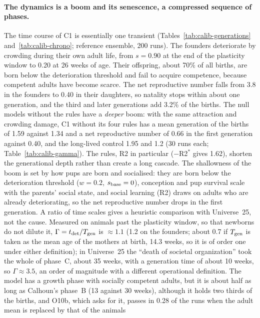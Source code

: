 \paragraph{The dynamics is a boom and its senescence, a compressed sequence of phases.}
The time course of \textsf{C1} is essentially one transient (Tables~\ref{tab:calib-generations}
and~\ref{tab:calib-chrono}; reference ensemble, 200 runs). The founders deteriorate by crowding during their own adult
life, from $s=0.90$ at the end of the plasticity window to 0.20 at 26 weeks of age. Their offspring, about 70\% of
all births, are born below the deterioration threshold and fail to acquire competence, because competent adults have
become scarce. The net reproductive number falls from 3.8 in the founders to 0.40 in their daughters, so natality
stops within about one generation, and the third and later generations add 3.2\% of the births. The null
models without the rules have a \emph{deeper} boom: with the same attraction and crowding damage, \textsf{C1}
without its four rules has a mean generation of the births of 1.59 against 1.34 and a net reproductive number of 0.66
in the first generation against 0.40, and the long-lived control 1.95 and 1.2 (30 runs each;
Table~\ref{tab:calib-gamma}). The rules, R2 in particular ($-$R2$^*$ gives 1.62), shorten the generational depth
rather than create a long cascade.
The shallowness of the boom is set by how pups are born and socialised: they are born below the deterioration
threshold ($w=0.2$, $s_{\rm base}=0$), conception and pup survival scale with the parents' social state, and social
learning (R2) draws on adults who are already deteriorating, so the net reproductive number drops in the first
generation. A ratio of time scales gives a heuristic comparison with Universe~25, not the cause. Measured on animals
past the plasticity window, so that newborns do not dilute it, $\Gamma=t_{\rm det}/T_{\rm gen}$ is
$\approx1.1$ (1.2 on the founders; about 0.7 if $T_{\rm gen}$ is taken as the mean age of the mothers at birth,
14.3 weeks, so it is of order one under either definition); in Universe~25 the ``death of societal organization'' took the whole of phase~C, about 35
weeks, with a generation time of about 10 weeks, so $\Gamma\approx3.5$, an order of magnitude with a different
operational definition. The model has a growth phase with
socially competent adults, but it is about half as long as Calhoun's phase~B (13 against 30 weeks), although it holds two thirds
of the births, and O10b, which asks for it, passes in 0.28 of the runs when the adult mean is replaced by that of the animals
